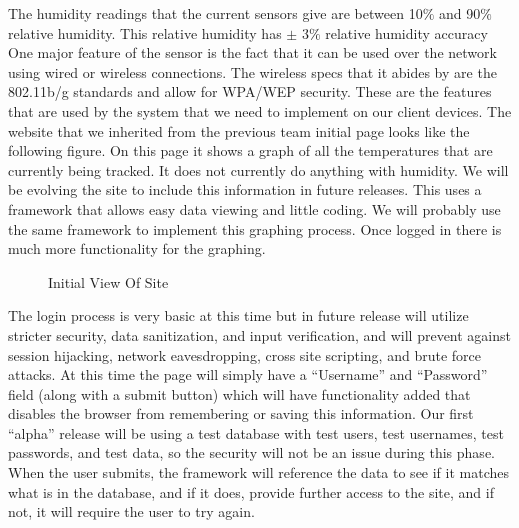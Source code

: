 \documentclass{report}
\begin{document}
 The humidity readings that the current sensors give are between 10$\%$ and 90$\%$ relative humidity. 
This relative humidity has $\pm$ 3$\%$ relative humidity accuracy One major feature of the sensor is the fact that it can be used over the network using wired or wireless connections. 
The wireless specs that it abides by are the 802.11b/g standards and allow for WPA/WEP security. 
These are the features that are used by the system that we need to implement on our client devices.
\newline
\indent
The website that we inherited from the previous team initial page looks like the following figure. 
On this page it shows a graph of all the temperatures that are currently being tracked. 
It does not currently do anything with humidity.  We will be evolving the site to include this information in future releases. 
This uses a framework that allows easy data viewing and little coding. 
We will probably use the same framework to implement this graphing process. 
Once logged in there is much more functionality for the graphing. 
\begin{figure}[H]
\caption{Initial View Of Site}
\end{figure}
The login process is very basic at this time but in future release will utilize stricter security, data sanitization, and input verification,
and will prevent against session hijacking, network eavesdropping, cross site scripting, and brute force attacks. 
At this time the page will simply have a “Username” and “Password” field (along with a submit button) which will have functionality
added that disables the browser from remembering or saving this information. 
Our first “alpha” release will be using a test database with test users, test usernames, test passwords, and test data, so the security
will not be an issue during this phase. When the user submits, the framework will reference the data to see if it matches what is in the database, and if it does, provide further access to the site, and if not, it will require the user to try again. 
\end{document}
